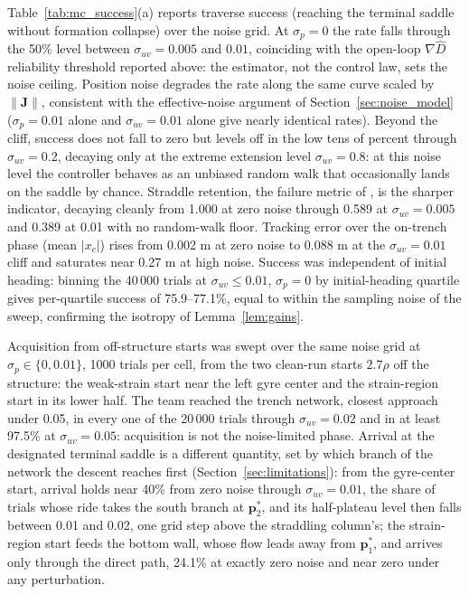 \documentclass[lettersize,journal]{IEEEtran}
\begin{document}
Table~\ref{tab:mc_success}(a) reports traverse success (reaching the
terminal saddle without formation collapse) over the noise grid. At
$\sigma_p = 0$ the rate falls through the 50\% level between
$\sigma_{uv} = 0.005$ and $0.01$, coinciding with the open-loop
$\nabla\hat{D}$ reliability threshold reported above: the estimator,
not the control law, sets the noise ceiling. Position noise degrades
the rate along the same curve scaled by $\|\mathbf{J}\|$, consistent
with the effective-noise argument of Section~\ref{sec:noise_model}
($\sigma_p = 0.01$ alone and $\sigma_{uv} = 0.01$ alone give nearly
identical rates). Beyond the cliff, success does not fall to zero but
levels off in the low tens of percent through $\sigma_{uv} = 0.2$,
decaying only at the extreme extension level $\sigma_{uv} = 0.8$: at
this noise level the controller behaves as an unbiased random walk
that occasionally lands on the saddle by chance. Straddle retention,
the failure metric
of \cite{9}, is the sharper indicator, decaying cleanly from 1.000 at
zero noise through 0.589 at $\sigma_{uv} = 0.005$ and 0.389 at 0.01
with no random-walk floor. Tracking
error over the on-trench phase (mean $|x_c|$) rises from 0.002 m at zero
noise to 0.088 m at the $\sigma_{uv} = 0.01$ cliff and saturates near
0.27 m at high noise. Success was independent of initial heading: binning the 40\,000
trials at $\sigma_{uv} \leq 0.01$, $\sigma_p = 0$ by initial-heading
quartile gives per-quartile success of 75.9--77.1\%, equal to within
the sampling noise of the sweep, confirming the isotropy of
Lemma~\ref{lem:gains}.

Acquisition from off-structure starts was swept over the same noise
grid at $\sigma_p \in \{0, 0.01\}$, 1000 trials per cell, from the two
clean-run starts $2.7\rho$ off the structure: the weak-strain start
near the left gyre center and the strain-region start in its lower
half. The team reached the trench network, closest approach under
0.05, in every one of the 20\,000 trials through $\sigma_{uv} = 0.02$
and in at least 97.5\% at $\sigma_{uv} = 0.05$: acquisition is not the
noise-limited phase. Arrival at the designated terminal saddle is a
different quantity, set by which branch of the network the descent
reaches first (Section~\ref{sec:limitations}): from the gyre-center
start, arrival holds near 40\% from zero noise through
$\sigma_{uv} = 0.01$, the share of trials whose ride takes the south
branch at $\mathbf{p}^*_2$, and its half-plateau level then falls
between 0.01 and 0.02, one grid step above the straddling column's;
the strain-region start feeds the bottom wall, whose flow leads away
from $\mathbf{p}^*_1$, and arrives only through the direct path,
24.1\% at exactly zero noise and near zero under any perturbation.
\end{document}
